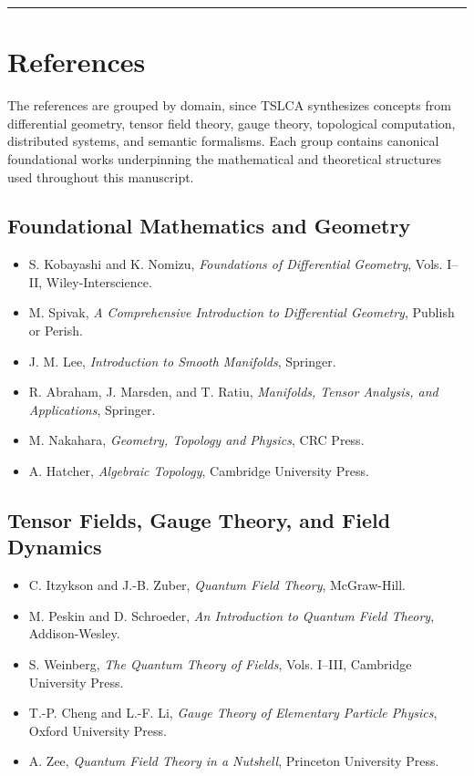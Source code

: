 \begin{center}\rule{0.5\linewidth}{0.5pt}\end{center}

\section{References}\label{references}

The references are grouped by domain, since TSLCA synthesizes concepts from differential geometry, tensor field theory, gauge theory, topological computation, distributed systems, and semantic formalisms. Each group contains canonical foundational works underpinning the mathematical and theoretical structures used throughout this manuscript.

\subsection*{Foundational Mathematics and Geometry}

\begin{itemize}
\tightlist
\item S. Kobayashi and K. Nomizu, \emph{Foundations of Differential Geometry}, Vols. I--II, Wiley-Interscience.
\item M. Spivak, \emph{A Comprehensive Introduction to Differential Geometry}, Publish or Perish.
\item J. M. Lee, \emph{Introduction to Smooth Manifolds}, Springer.
\item R. Abraham, J. Marsden, and T. Ratiu, \emph{Manifolds, Tensor Analysis, and Applications}, Springer.
\item M. Nakahara, \emph{Geometry, Topology and Physics}, CRC Press.
\item A. Hatcher, \emph{Algebraic Topology}, Cambridge University Press.
\end{itemize}

\subsection*{Tensor Fields, Gauge Theory, and Field Dynamics}

\begin{itemize}
\tightlist
\item C. Itzykson and J.-B. Zuber, \emph{Quantum Field Theory}, McGraw-Hill.
\item M. Peskin and D. Schroeder, \emph{An Introduction to Quantum Field Theory}, Addison-Wesley.
\item S. Weinberg, \emph{The Quantum Theory of Fields}, Vols. I--III, Cambridge University Press.
\item T.-P. Cheng and L.-F. Li, \emph{Gauge Theory of Elementary Particle Physics}, Oxford University Press.
\item A. Zee, \emph{Quantum Field Theory in a Nutshell}, Princeton University Press.
\end{itemize}

